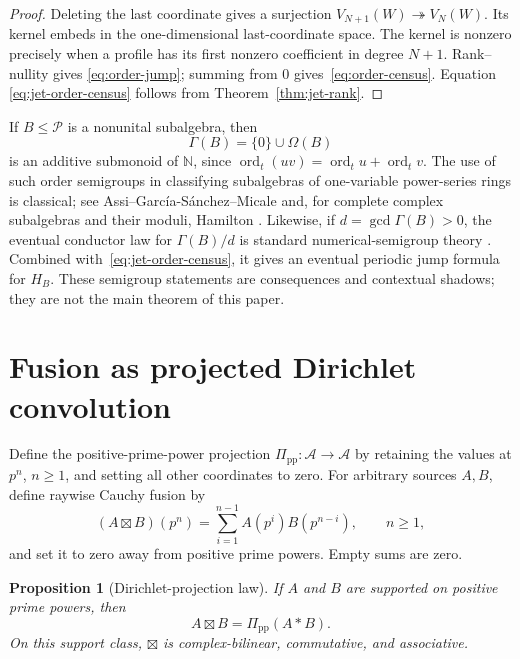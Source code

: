 \documentclass[11pt]{article}
\newtheorem{proposition}[theorem]{Proposition}
\theoremstyle{definition}
\theoremstyle{remark}
\newcommand{\N}{\mathbb N}
\newcommand{\A}{\mathcal A}
\newcommand{\Pcal}{\mathcal P}
\newcommand{\ord}{\operatorname{ord}}
\begin{document}
\begin{proof}
Deleting the last coordinate gives a surjection $V_{N+1}(W)\twoheadrightarrow V_N(W)$.  Its
kernel embeds in the one-dimensional last-coordinate space.  The kernel is nonzero precisely
when a profile has its first nonzero coefficient in degree $N+1$.  Rank--nullity gives
\eqref{eq:order-jump}; summing from $0$ gives~\eqref{eq:order-census}.  Equation
\eqref{eq:jet-order-census} follows from Theorem~\ref{thm:jet-rank}.
\end{proof}

If $B\le\Pcal$ is a nonunital subalgebra, then
\[
 \Gamma(B)=\{0\}\cup\Omega(B)
\]
is an additive submonoid of $\N$, since $\ord_t(uv)=\ord_tu+\ord_tv$.  The use of such order
semigroups in classifying subalgebras of one-variable power-series rings is classical; see
Assi--Garc\'{i}a-S\'{a}nchez--Micale \cite{AssiGarciaSanchezMicale2017} and, for complete complex
subalgebras and their moduli, Hamilton \cite{Hamilton2020}.  Likewise, if $d=\gcd\Gamma(B)>0$,
the eventual conductor law for $\Gamma(B)/d$ is standard numerical-semigroup theory
\cite{RosalesGarciaSanchez2009}.  Combined with~\eqref{eq:jet-order-census}, it gives an eventual
periodic jump formula for $H_B$.  These semigroup statements are consequences and contextual
shadows; they are not the main theorem of this paper.

\section{Fusion as projected Dirichlet convolution}\label{sec:fusion}

Define the positive-prime-power projection $\Pi_{\mathrm{pp}}:\A\to\A$ by retaining the values at
$p^n$, $n\ge1$, and setting all other coordinates to zero.  For arbitrary sources $A,B$, define
raywise Cauchy fusion by
\begin{equation}\label{eq:fusion-definition}
 (A\boxtimes B)(p^n)=\sum_{i=1}^{n-1}A(p^i)B(p^{n-i}),
 \qquad n\ge1,
\end{equation}
and set it to zero away from positive prime powers.  Empty sums are zero.

\begin{proposition}[Dirichlet-projection law]\label{prop:fusion-natural}
If $A$ and $B$ are supported on positive prime powers, then
\begin{equation}\label{eq:fusion-natural}
 A\boxtimes B=\Pi_{\mathrm{pp}}(A*B).
\end{equation}
On this support class, $\boxtimes$ is complex-bilinear, commutative, and associative.
\end{proposition}
\end{document}
